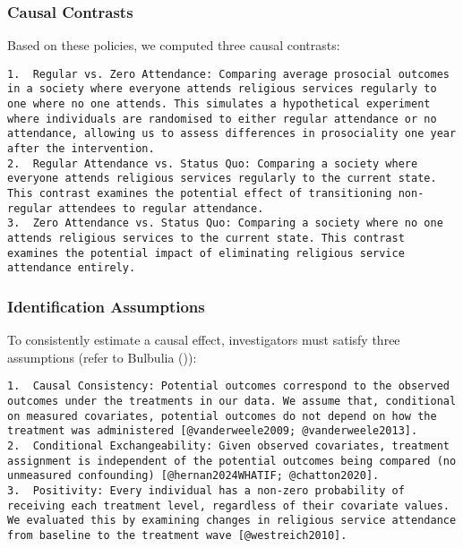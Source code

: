 \documentclass[
  single column]{article}
\begin{document}
\subsubsection{Causal Contrasts}\label{causal-contrasts}

Based on these policies, we computed three causal contrasts:

\begin{verbatim}
1.  Regular vs. Zero Attendance: Comparing average prosocial outcomes in a society where everyone attends religious services regularly to one where no one attends. This simulates a hypothetical experiment where individuals are randomised to either regular attendance or no attendance, allowing us to assess differences in prosociality one year after the intervention.
2.  Regular Attendance vs. Status Quo: Comparing a society where everyone attends religious services regularly to the current state. This contrast examines the potential effect of transitioning non-regular attendees to regular attendance.
3.  Zero Attendance vs. Status Quo: Comparing a society where no one attends religious services to the current state. This contrast examines the potential impact of eliminating religious service attendance entirely.
\end{verbatim}

\subsubsection{Identification
Assumptions}\label{identification-assumptions}

To consistently estimate a causal effect, investigators must satisfy
three assumptions (refer to Bulbulia
()):

\begin{verbatim}
1.  Causal Consistency: Potential outcomes correspond to the observed outcomes under the treatments in our data. We assume that, conditional on measured covariates, potential outcomes do not depend on how the treatment was administered [@vanderweele2009; @vanderweele2013].
2.  Conditional Exchangeability: Given observed covariates, treatment assignment is independent of the potential outcomes being compared (no unmeasured confounding) [@hernan2024WHATIF; @chatton2020].
3.  Positivity: Every individual has a non-zero probability of receiving each treatment level, regardless of their covariate values. We evaluated this by examining changes in religious service attendance from baseline to the treatment wave [@westreich2010].
\end{verbatim}
\end{document}
